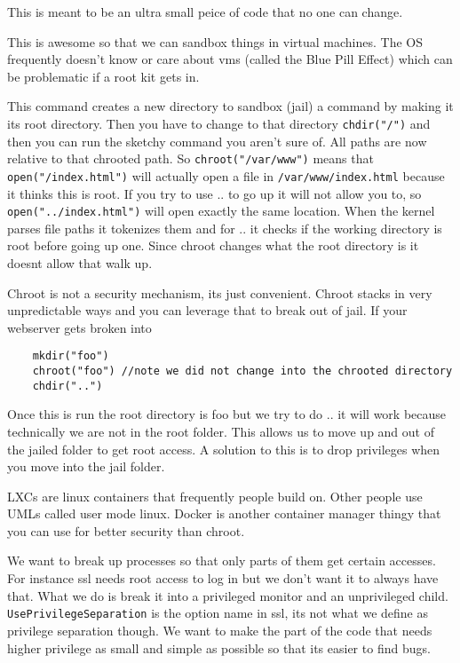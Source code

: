 \documentclass{article}
\begin{document}
\begin{itemizeP}

This is meant to be an ultra small peice of code that no one can change.


This is awesome so that we can sandbox things in virtual machines. The OS frequently doesn't know or care about vms (called the Blue Pill Effect) which can be problematic if a root kit gets in.




This command creates a new directory to sandbox (jail) a command by making it its root directory. Then you have to change to that directory \texttt{chdir("/")} and then you can run the sketchy command you aren't sure of. All paths are now relative to that chrooted path. So \texttt{chroot("/var/www")} means that \texttt{open("/index.html")} will actually open a file in \texttt{/var/www/index.html} because it thinks this is root. If you try to use .. to go up it will not allow you to, so \texttt{open("../index.html")} will open exactly the same location. When the kernel parses file paths it tokenizes them and for .. it checks if the working directory is root before going up one. Since chroot changes what the root directory is it doesnt allow that walk up.

Chroot is not a security mechanism, its just convenient. Chroot stacks in very unpredictable ways and you can leverage that to break out of jail. If your webserver gets broken into 

\begin{lstlisting}
	mkdir("foo")
	chroot("foo") //note we did not change into the chrooted directory 
	chdir("..")
\end{lstlisting}

Once this is run the root directory is foo but we try to do .. it will work because technically we are not in the root folder. This allows us to move up and out of the jailed folder to get root access. A solution to this is to drop privileges when you move into the jail folder. 

LXCs are linux containers that frequently people build on. Other people use UMLs called user mode linux. Docker is another container manager thingy that you can use for better security than chroot.


We want to break up processes so that only parts of them get certain accesses. For instance ssl needs root access to log in but we don't want it to always have that. What we do is break it into a privileged monitor and an unprivileged child. \texttt{UsePrivilegeSeparation} is the option name in ssl, its not what we define as privilege separation though. We want to make the part of the code that needs higher privilege as small and simple as possible so that its easier to find bugs.


\end{itemizeP}
\end{document}
